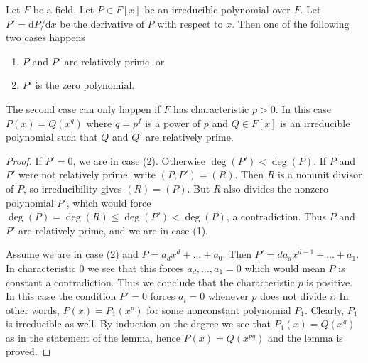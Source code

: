 \begin{lemma}
\label{lemma-irreducible-polynomials}
Let $F$ be a field. Let $P \in F[x]$ be an irreducible polynomial over $F$.
Let $P' = \text{d}P/\text{d}x$ be the derivative of $P$ with respect
to $x$. Then one of the following two cases happens
\begin{enumerate}
\item $P$ and $P'$ are relatively prime, or
\item $P'$ is the zero polynomial.
\end{enumerate}
The second case can only happen if $F$ has characteristic $p > 0$.
In this case $P(x) = Q(x^q)$ where $q = p^f$ is a power of $p$ and
$Q \in F[x]$ is an irreducible polynomial such that $Q$ and $Q'$
are relatively prime.
\end{lemma}

\begin{proof}
If $P' = 0$, we are in case (2). Otherwise
$\deg(P') < \deg(P)$. If $P$ and $P'$ were not relatively prime,
write $(P, P') = (R)$. Then $R$ is a nonunit divisor of $P$,
so irreducibility gives $(R) = (P)$. But $R$ also divides the
nonzero polynomial $P'$, which would force
$\deg(P) = \deg(R) \leq \deg(P') < \deg(P)$, a contradiction.
Thus $P$ and $P'$ are relatively prime, and we are in case (1).

\medskip\noindent
Assume we are in case (2) and $P = a_d x^d + \ldots + a_0$. Then
$P' = da_d x^{d - 1} + \ldots + a_1$. In characteristic $0$ we see
that this forces $a_d, \ldots, a_1 = 0$ which would mean $P$ is constant
a contradiction. Thus we conclude that the characteristic $p$ is positive.
In this case the condition $P' = 0$ forces $a_i = 0$ whenever $p$ does
not divide $i$.
In other words, $P(x) = P_1(x^p)$ for some nonconstant polynomial $P_1$.
Clearly, $P_1$ is irreducible as well. By induction on the degree we
see that $P_1(x) = Q(x^q)$ as in the statement of the lemma, hence
$P(x) = Q(x^{pq})$ and the lemma is proved.
\end{proof}
